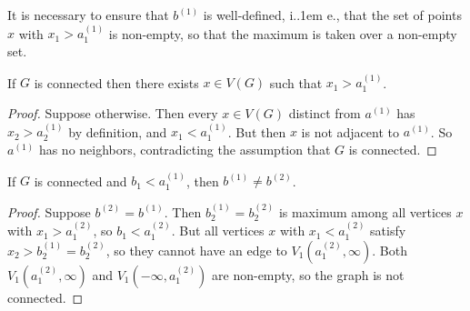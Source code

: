 \documentclass{theoretics}
\makeatletter
\newcommand*\ie{i.\kern.1em e.\@\xspace} %
\makeatother
\begin{document}
It is necessary to ensure that $b^{(1)}$ is well-defined, \ie, that the set of points $x$ with $x_1
> a^{(1)}_1$ is non-empty, so that the maximum is taken over a non-empty set.
\begin{proposition}
	If $G$ is connected then there exists $x \in V(G)$ such that $x_1 > a^{(1)}_1$.
\end{proposition}
\begin{proof}
	Suppose otherwise. Then every $x \in V(G)$ distinct from $a^{(1)}$ has $x_2 > a^{(1)}_2$ by
	definition, and $x_1 < a^{(1)}_1$. But then $x$ is not adjacent to $a^{(1)}$. So $a^{(1)}$ has no
	neighbors, contradicting the assumption that $G$ is connected.
\end{proof}

\begin{proposition}
	If $G$ is connected and $b_1 < a^{(1)}_1$, then $b^{(1)} \neq b^{(2)}$.
\end{proposition}
\begin{proof}
	Suppose $b^{(2)}=b^{(1)}$. Then $b^{(1)}_2=b^{(2)}_2$ is maximum among all vertices $x$ with $x_1 >
	a^{(2)}_1$, so $b_1 < a^{(2)}_1$. But all vertices $x$ with $x_1 < a^{(2)}_1$ satisfy $x_2 >
	b^{(1)}_2=b^{(2)}_2$, so they cannot have an edge to $V_1(a^{(2)}_1,\infty)$. Both
	$V_1(a^{(2)}_1,\infty)$ and $V_1(-\infty, a^{(2)}_1)$ are non-empty, so the graph is not connected.
\end{proof}
\end{document}
